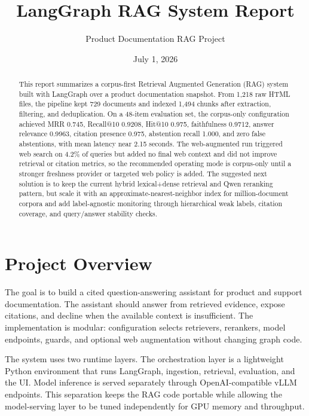 \documentclass[11pt]{article}
\title{LangGraph RAG System Report}
\author{Product Documentation RAG Project}
\date{July 1, 2026}
\begin{document}
\maketitle

\begin{abstract}
This report summarizes a corpus-first Retrieval Augmented Generation (RAG) system built
with LangGraph over a product documentation snapshot. From 1,218 raw HTML files, the
pipeline kept 729 documents and indexed 1,494 chunks after extraction, filtering, and
deduplication. On a 48-item evaluation set, the corpus-only configuration achieved
MRR 0.745, Recall@10 0.9208, Hit@10 0.975, faithfulness 0.9712, answer relevance
0.9963, citation presence 0.975, abstention recall 1.000, and zero false abstentions,
with mean latency near 2.15 seconds. The web-augmented run triggered web search on
4.2\% of queries but added no final web context and did not improve retrieval or
citation metrics, so the recommended operating mode is corpus-only until a stronger
freshness provider or targeted web policy is added. The suggested next solution is to
keep the current hybrid lexical+dense retrieval and Qwen reranking pattern, but scale it
with an approximate-nearest-neighbor index for million-document corpora and add
label-agnostic monitoring through hierarchical weak labels, citation coverage, and
query/answer stability checks.
\end{abstract}

\tableofcontents
\newpage

\section{Project Overview}

The goal is to build a cited question-answering assistant for product and support
documentation. The assistant should answer from retrieved evidence, expose citations, and
decline when the available context is insufficient. The implementation is modular:
configuration selects retrievers, rerankers, model endpoints, guards, and optional web
augmentation without changing graph code.

The system uses two runtime layers. The orchestration layer is a lightweight Python
environment that runs LangGraph, ingestion, retrieval, evaluation, and the UI. Model
inference is served separately through OpenAI-compatible vLLM endpoints. This separation
keeps the RAG code portable while allowing the model-serving layer to be tuned
independently for GPU memory and throughput.
\end{document}
